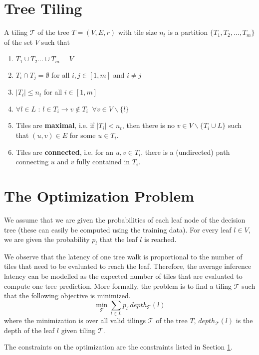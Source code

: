 \section{Tree Tiling}
\label{TreeTilingSection}
A tiling $\mathcal{T}$ of the tree $T = (V, E, r)$ with tile size $n_t$ is a partition $\{ T_1, T_2, ... ,T_m \}$ of the set $V$ such that 
\begin{enumerate}
    \item $T_1 \cup T_2 ... \cup T_m = V$
    \item $T_i \cap T_j = \emptyset$ for all $i, j \in [1, m]$ and $i \neq j$
    \item $|T_i| \leq n_t$ for all $i \in [1, m]$
    \item $\forall l \in L$ : $l \in T_i \rightarrow v \notin T_i \;\; \forall v \in V \backslash \{l\}$
    \item Tiles are \textbf{maximal}, i.e. if $|T_i| < n_t$, then there is no $v \in V\backslash \{ T_i \cup L \}$ such that $(u, v) \in E$ for some $u \in T_i$. 
    \item Tiles are \textbf{connected}, i.e. for an $u, v \in T_i$, there is a (undirected) path connecting $u$ and $v$ fully contained in $T_i$.
\end{enumerate} 

\section{The Optimization Problem}

We assume that we are given the probabilities of each leaf node of the decision tree (these can easily be computed using the training data). For every leaf $l \in V$, we are given the probability $p_l$ that the leaf $l$ is reached. 

We observe that the latency of one tree walk is proportional to the number of tiles that need to be evaluated to reach the leaf.
Therefore, the average inference latency can be modelled as the expected number of tiles that are evaluated to compute one tree prediction. More formally, the problem is to find a tiling $\mathcal{T}$ such that the following objective is minimized.
\[
    \min_{\mathcal{T}}{\sum_{l \in L} p_l.depth_{\mathcal{T}}(l)}
\]
where the minimization is over all valid tilings $\mathcal{T}$ of the tree $T$, $depth_{\mathcal{T}}(l)$ is the depth of the leaf $l$ given tiling ${\mathcal{T}}$.

The constraints on the optimization are the constraints listed in Section \ref{TreeTilingSection}. 

